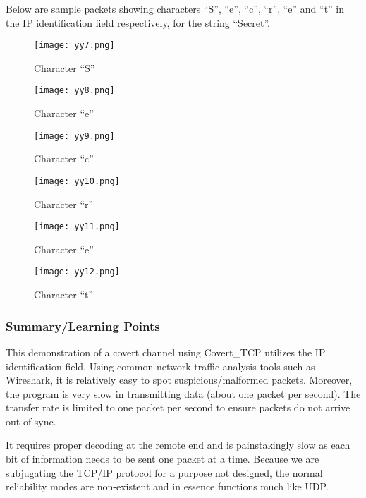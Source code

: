 \documentclass[letterpaper,twocolumn,10pt]{article}
\begin{document}
Below are sample packets showing characters “S”, “e”, “c”, “r”, “e” and “t” in the IP identification field respectively, for the string “Secret”.
\begin{figure}[H]
    \centering
    \texttt{[image: yy7.png]}
    \caption{Character “S”}
\end{figure}

\begin{figure}[H]
    \centering
    \texttt{[image: yy8.png]}
    \caption{Character “e”}
\end{figure}

\begin{figure}[H]
    \centering
    \texttt{[image: yy9.png]}
    \caption{Character “c”}
\end{figure}

\begin{figure}[H]
    \centering
    \texttt{[image: yy10.png]}
    \caption{Character “r”}
\end{figure}

\begin{figure}[H]
    \centering
    \texttt{[image: yy11.png]}
    \caption{Character “e”}
\end{figure}

\begin{figure}[H]
    \centering
    \texttt{[image: yy12.png]}
    \caption{Character “t”}
\end{figure}

\subsubsection{Summary/Learning Points}

This demonstration of a covert channel using Covert\_TCP utilizes the IP identification field. Using common network traffic analysis tools such as Wireshark, it is relatively easy to spot suspicious/malformed packets. Moreover, the program is very slow in transmitting data (about one packet per second). The transfer rate is limited to one packet per second to ensure packets do not arrive out of sync. 

It requires proper decoding at the remote end and is painstakingly slow as each bit of information needs to be sent one packet at a time. Because we are subjugating the TCP/IP protocol for a purpose not designed, the normal reliability modes are non-existent and in essence functions much like UDP.


\end{document}

